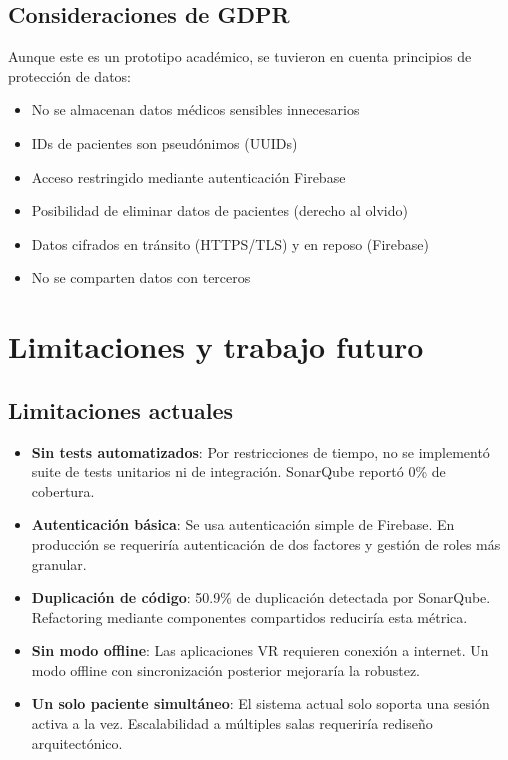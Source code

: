 \subsection{Consideraciones de GDPR}

Aunque este es un prototipo académico, se tuvieron en cuenta principios de protección de datos:
\begin{itemize}
    \item No se almacenan datos médicos sensibles innecesarios
    \item IDs de pacientes son pseudónimos (UUIDs)
    \item Acceso restringido mediante autenticación Firebase
    \item Posibilidad de eliminar datos de pacientes (derecho al olvido)
    \item Datos cifrados en tránsito (HTTPS/TLS) y en reposo (Firebase)
    \item No se comparten datos con terceros
\end{itemize}

\section{Limitaciones y trabajo futuro}

\subsection{Limitaciones actuales}

\begin{itemize}
    \item \textbf{Sin tests automatizados}: Por restricciones de tiempo, no se implementó suite de tests unitarios ni de integración. SonarQube reportó 0\% de cobertura.
    
    \item \textbf{Autenticación básica}: Se usa autenticación simple de Firebase. En producción se requeriría autenticación de dos factores y gestión de roles más granular.
    
    \item \textbf{Duplicación de código}: 50.9\% de duplicación detectada por SonarQube. Refactoring mediante componentes compartidos reduciría esta métrica.
    
    \item \textbf{Sin modo offline}: Las aplicaciones VR requieren conexión a internet. Un modo offline con sincronización posterior mejoraría la robustez.
    
    \item \textbf{Un solo paciente simultáneo}: El sistema actual solo soporta una sesión activa a la vez. Escalabilidad a múltiples salas requeriría rediseño arquitectónico.
\end{itemize}

